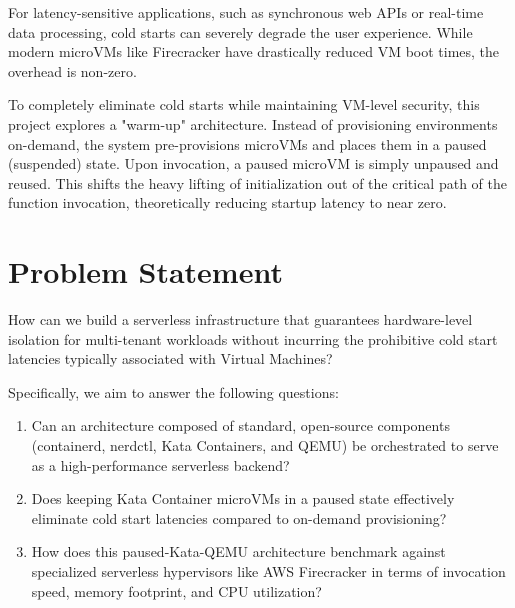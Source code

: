 \documentclass[12pt,a4paper]{report}
\begin{document}
For latency-sensitive applications, such as synchronous web APIs or real-time data processing, cold starts can severely degrade the user experience. While modern microVMs like Firecracker have drastically reduced VM boot times, the overhead is non-zero.

To completely eliminate cold starts while maintaining VM-level security, this project explores a "warm-up" architecture. Instead of provisioning environments on-demand, the system pre-provisions microVMs and places them in a paused (suspended) state. Upon invocation, a paused microVM is simply unpaused and reused. This shifts the heavy lifting of initialization out of the critical path of the function invocation, theoretically reducing startup latency to near zero.

\section{Problem Statement}
How can we build a serverless infrastructure that guarantees hardware-level isolation for multi-tenant workloads without incurring the prohibitive cold start latencies typically associated with Virtual Machines?

Specifically, we aim to answer the following questions:
\begin{enumerate}
    \item Can an architecture composed of standard, open-source components (containerd, nerdctl, Kata Containers, and QEMU) be orchestrated to serve as a high-performance serverless backend?
    \item Does keeping Kata Container microVMs in a paused state effectively eliminate cold start latencies compared to on-demand provisioning?
    \item How does this paused-Kata-QEMU architecture benchmark against specialized serverless hypervisors like AWS Firecracker in terms of invocation speed, memory footprint, and CPU utilization?
\end{enumerate}
\end{document}
